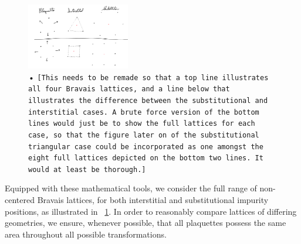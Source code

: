 \documentclass[aps,pra,superscriptaddress,twocolumn]{revtex4-1}
\newcommand{\fref}[1]{\text{Fig.}~\ref{#1}}
\newcommand{\commentSB}[1]{\texttt{\color{blue}[#1]}}
\begin{document}
\begin{figure}
    \centering
    \includegraphics[width=0.4\textwidth]{figures/triangle_and_square.png} 
    \caption{• \commentSB{This needs to be remade so that a top line illustrates all four Bravais lattices, and a line below that illustrates the difference between the substitutional and interstitial cases. A brute force version of the bottom lines would just be to show the full lattices for each case, so that the figure later on of the substitutional triangular case could be incorporated as one amongst the eight full lattices depicted on the bottom two lines. It would at least be thorough.}}
    \label{fig:Bravais}
\end{figure}

Equipped with these mathematical tools, we consider the full range of non-centered Bravais lattices, for both interstitial and substitutional impurity positions, as illustrated in \fref{fig:Bravais}. In order to reasonably compare lattices of differing geometries, we ensure, whenever possible, that all plaquettes possess the same area throughout all possible transformations. 




\end{document}
